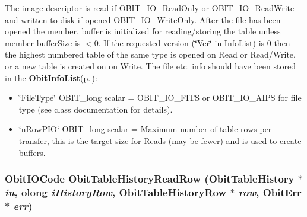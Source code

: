 The image descriptor is read if OBIT\_\-IO\_\-Read\-Only or OBIT\_\-IO\_\-Read\-Write and written to disk if opened OBIT\_\-IO\_\-Write\-Only. After the file has been opened the member, buffer is initialized for reading/storing the table unless member buffer\-Size is $<$0. If the requested version (\char`\"{}Ver\char`\"{} in Info\-List) is 0 then the highest numbered table of the same type is opened on Read or Read/Write, or a new table is created on on Write. The file etc. info should have been stored in the {\bf Obit\-Info\-List}{\rm (p.\,\pageref{structObitInfoList})}: \begin{itemize}
\item \char`\"{}File\-Type\char`\"{} OBIT\_\-long scalar = OBIT\_\-IO\_\-FITS or OBIT\_\-IO\_\-AIPS for file type (see class documentation for details). \item \char`\"{}n\-Row\-PIO\char`\"{} OBIT\_\-long scalar = Maximum number of table rows per transfer, this is the target size for Reads (may be fewer) and is used to create buffers. 
\end{itemize}
\subsubsection{\setlength{\rightskip}{0pt plus 5cm}Obit\-IOCode Obit\-Table\-History\-Read\-Row ({\bf Obit\-Table\-History} $\ast$ {\em in}, {\bf olong} {\em i\-History\-Row}, {\bf Obit\-Table\-History\-Row} $\ast$ {\em row}, {\bf Obit\-Err} $\ast$ {\em err})}\label{ObitTableHistory_8c_a22}


